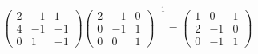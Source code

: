 {\[\begin{pmatrix}
        2 & -1 & 1 \\
        4 & -1 & -1 \\
        0 & 1 & -1
        \end{pmatrix} \begin{pmatrix}
        2 & -1 & 0 \\
        0 & -1 & 1 \\
        0 & 0 & 1
        \end{pmatrix}^{-1} = \begin{pmatrix}
            1 & 0 & 1 \\
            2 & -1 & 0 \\
            0 & -1 & 1
        \end{pmatrix}
    \]



}